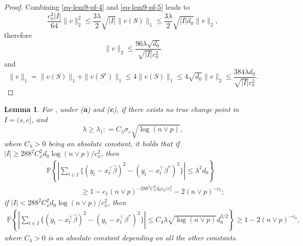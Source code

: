 \documentclass[twoside]{article}
\newtheorem{lemma}[theorem]{Lemma}
\begin{document}
\begin{proof}
Combining \eqref{eq-lem9-pf-4} and \eqref{eq-lem9-pf-5} leads to
	\[
		\frac{c_x^2|I|}{64} \|v\|_2^2 \leq \frac{3\lambda}{2}\sqrt{|I|} \|v(S)\|_1 \leq \frac{3\lambda}{2}\sqrt{|I|d_0} \|v\|_2,
	\]	
	therefore
	\[
		\|v\|_2 \leq \frac{96 \lambda\sqrt{d_0}}{\sqrt{|I|} c_x^2}
	\]
	and 
	\[
		\|v\|_1 = \|v(S)\|_1 + \|v(S^c)\|_1 \leq 4\|v(S)\|_1 \leq 4\sqrt{d_0}\|v\|_2 \leq \frac{384 \lambda d_0}{\sqrt{|I|} c_x^2}.
	\]
\end{proof}

\begin{lemma}\label{lemma:RSS lasso} 
For , under (\textbf{a}) and (\textbf{c}), if there exists no true change point in $I = (s, e]$, and
	\[
		\lambda \geq \lambda_1 : = C_{\lambda}\sigma_{\varepsilon} \sqrt{\log(n \vee p)},
	\]
	where $C_{\lambda} > 0$ being an absolute constant, it holds that if $|I| \geq 288^2 C^2_x d_0 \log(n \vee p)/c_x^2$, then
	\begin{align*}
		& \mathbb{P}\left\{\left|\sum_{t \in I} \bigl\{(y_t - x_t^{\top}\widehat{\beta})^2 - (y_t - x_t^{\top}\beta^*)^2\bigr\}\right| \leq \lambda^2 d_0 \right\} \\
		& \hspace{2cm}\geq 	1 - c_1 (n \vee p)^{-288^2C_x^2d_0c_2/c_x^2} - 2(n \vee p)^{-c_3};
	\end{align*}
	if $|I| < 288^2 C^2_x d_0 \log(n \vee p)/c_x^2$, then 
	\begin{align*}
		\mathbb{P}\left\{\left|\sum_{t \in I} \bigl\{(y_t - x_t^{\top}\widehat{\beta})^2 - (y_t - x_t^{\top}\beta^*)^2\bigr\}\right| \leq C_4 \lambda \sqrt{\log(n \vee p)} d_0^{3/2}\right\} \geq 1 - 2(n \vee p)^{-c_3},
	\end{align*}
	where $C_4 > 0$ is an absolute constant depending on all the other constants.
\end{lemma} 
\end{document}

